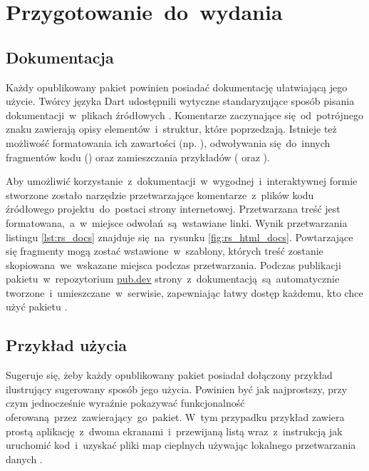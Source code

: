 \section{Przygotowanie~do~wydania}

\subsection{Dokumentacja}
Każdy opublikowany pakiet powinien posiadać dokumentację ułatwiającą jego użycie. Twórcy języka Dart udostępnili wytyczne standaryzujące sposób pisania dokumentacji~w~plikach źródłowych \cite{Dart_Doc_Guidelines}. Komentarze zaczynające się~od~potrójnego znaku \codeinline{///} zawierają opisy elementów~i~struktur, które poprzedzają. Istnieje też możliwość formatowania ich zawartości (np. ), odwoływania się~do~innych fragmentów kodu () oraz zamieszczania przykładów ( oraz ).

\bigskip


Aby umożliwić korzystanie~z~dokumentacji~w~wygodnej~i~interaktywnej formie stworzone zostało narzędzie  \cite{Dart_Doc} przetwarzające komentarze~z~plików kodu źródłowego projektu~do~postaci strony internetowej. Przetwarzana treść jest formatowana,~a~w~miejsce odwołań~są~wstawiane linki. Wynik przetwarzania listingu \ref{lst:rs_docs} znajduje się~na~rysunku \ref{fig:rs_html_docs}. Powtarzające się fragmenty mogą zostać wstawione~w~szablony, których treść zostanie skopiowana~we~wskazane miejsca podczas przetwarzania. Podczas publikacji pakietu~w~repozytorium \href{https://pub.dev/}{pub.dev} strony~z~dokumentacją~są~automatycznie tworzone~i~umieszczane~w~serwisie, zapewniając łatwy dostęp każdemu, kto chce użyć pakietu \cite{RS_Documentation}.

\bigskip
{}

\subsection{Przykład użycia}
\label{sec:rs_example}
Sugeruje się, żeby każdy opublikowany pakiet posiadał dołączony przykład ilustrujący sugerowany sposób jego użycia. Powinien być jak najprostszy, przy czym jednocześnie wyraźnie pokazywać funkcjonalność oferowaną~przez~zawierający~go~pakiet. W~tym przypadku przykład zawiera prostą aplikację~z~dwoma ekranami~i~przewijaną listą wraz~z~instrukcją jak uruchomić kod~i~uzyskać pliki map cieplnych używając lokalnego przetwarzania danych \cite{RS_Example}.

